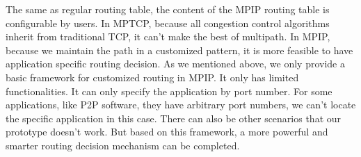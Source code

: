 The same as regular routing table, the content of the MPIP routing table is configurable by users. In MPTCP, because all congestion control algorithms inherit from traditional TCP, it can't make the best of multipath. In MPIP, because we maintain the path in a customized pattern, it is more feasible to have application specific routing decision. As we mentioned above, we only provide a basic framework for customized routing in MPIP. It only has limited functionalities. It can only specify the application by port number. For some applications, like P2P software, they have arbitrary port numbers, we can't locate the specific application in this case. There can also be other scenarios that our prototype doesn't work. But based on this framework, a more powerful and smarter routing decision mechanism can be completed.

